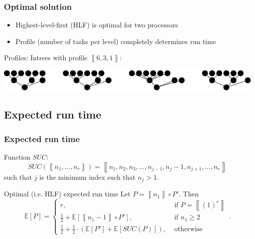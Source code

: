 \documentclass{beamer}
\newcommand{\profile}[1]{\left\llbracket #1 \right\rrbracket}
\newcommand{\profileconcat}{\circ}
\newcommand{\profilerepeat}[2]{{(#1)}^{#2}}
\newcommand{\profileones}[1]{\profilerepeat{1}{#1}}
\newcommand{\E}[1]{\mathbb{E}\left[ #1 \right]}
\begin{document}
\begin{frame}
  \frametitle{Optimal solution}
  \begin{itemize}
  \item Highest-level-first (HLF) is optimal for two processors
  \item Profile (number of tasks per level) completely determines run time
  \end{itemize}
  \begin{exampleblock}{Profiles: Intrees with profile $\profile{6,3,1}$:}
    \begin{center}
      \includegraphics{../thesis/p2/four_profiles_631.pdf}  
    \end{center}
  \end{exampleblock}
\end{frame}

\subsection{Expected run time}

\begin{frame}
  \frametitle{Expected run time}
  \begin{block}{Function $SUC$:}
    \begin{equation*}
      SUC(\profile{n_1,\dots,n_r}) = \profile{n_1, n_2, n_3,\dots,n_{j-1},n_j-1,n_{j+1},\dots,n_r} 
    \end{equation*}
    such that $j$ is the minimum index such that $n_j>1$.  
  \end{block}
  \begin{block}{Optimal (i.e. HLF) expected run time}
    Let $P=\profile{n_1}\profileconcat P'$. Then
    \begin{equation*}
      \E{P} =
      \begin{cases}
        r, & \text{ if } P = \profile{\profileones r} \\
        \frac{1}{2} + \E{\profile{n_1-1}\profileconcat P'} , & \text{ if } n_1\geq 2 \\
        \frac{1}{2} + \frac{1}{2} \cdot \left( \E{P'} + \E{SUC(P)} \right) ,& \text{ otherwise } 
      \end{cases}.
    \end{equation*}
  \end{block}
\end{frame}
\end{document}
